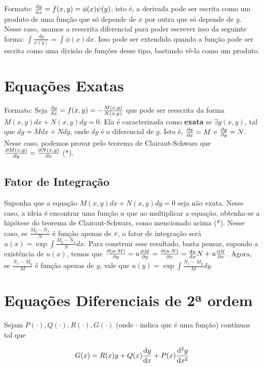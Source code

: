 \documentclass[12pt]{article}
\begin{document}
Formato: $\dv{y}{x} = f(x,y) = \phi(x)\psi(y)$, isto é, a derivada pode ser
escrita como um produto de uma função que só depende de $x$ por outra que só
depende de $y$. Nesse caso, usamos a reescrita diferencial para poder escrever
isso da seguinte forma: $\int \frac{dy}{\psi(y)} = \int \phi(x)dx$. Isso pode
ser extendido quando a função pode ser escrita como uma divisão de funções
desse tipo, bastando vê-la como um produto.  

\section{Equações Exatas}

Formato: Seja $\dv{y}{x} = f(x,y) = - \frac{M(x,y)}{N(x,y)}$ que pode ser
reescrita da forma $M(x,y)dx + N(x,y)dy = 0$. Ela é caracterizada como
\textbf{exata} se $\exists g(x,y)$, tal que $dg = Mdx + Ndy$, onde $dg$ é o
diferencial de $g$. Isto é, $\pdv{g}{x} = M$ e $\pdv{g}{y} = N$. Nesse caso,
podemos provar pelo teorema de Clairaut-Schwars que $\pdv{M(x,y)}{y} =
\pdv{N(x,y)}{x}$ (*). 

\subsection{Fator de Integração}

Suponha que a equação $M(x,y)dx + N(x,y)dy = 0$ seja não exata. Nesse caso, a
ideia é encontrar uma função $u$ que ao multiplicar a equação, obtenha-se a
hipótese do teorema de Clairaut-Schwars, como mencionado acima (*). Nesse
caso, se $\frac{M_y - N_x}{N}$ é função apenas de $x$, o fator de integração
será $u(x) = \exp{\int \frac{M_y - N_x}{N}dx}$. Para construir esse resultado,
basta pensar, supondo a existência de $u(x)$, temos que $\pdv{(u\cdot M)}{y} =
u\pdv{M}{y} = \pdv{(u\cdot N)}{x} = \dv{u}{x}N + u\pdv{N}{x}$. Agora, se $\frac{N_x
- M_y}{M}$ é função apenas de $y$, vale que $u(y) = \exp{\int \frac{N_x -
M_y}{M}dy}$. 

\section{Equações Diferenciais de 2ª ordem}

Sejam $P(\cdot), Q(\cdot), R(\cdot), G(\cdot)$ (onde $\cdot$ indica que é uma
função) contínuas tal que  

\begin{equation}
\label{eq:ordem2}
G(x) = R(x)y + Q(x)\dv{y}{x} +P(x)\dv[2]{y}{x}
\end{equation}
\end{document}
